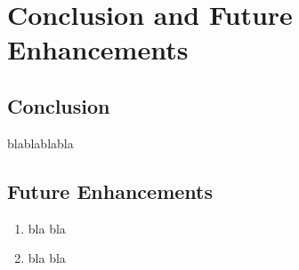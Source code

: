 \chapter{Conclusion and Future Enhancements}
\vspace{-18pt}
\section{Conclusion}
\vspace{-18pt}
blablablabla
\section{Future Enhancements}
\begin{enumerate}
	\item bla bla
	\item bla bla
\end{enumerate}
\renewcommand\bibname{References} %

